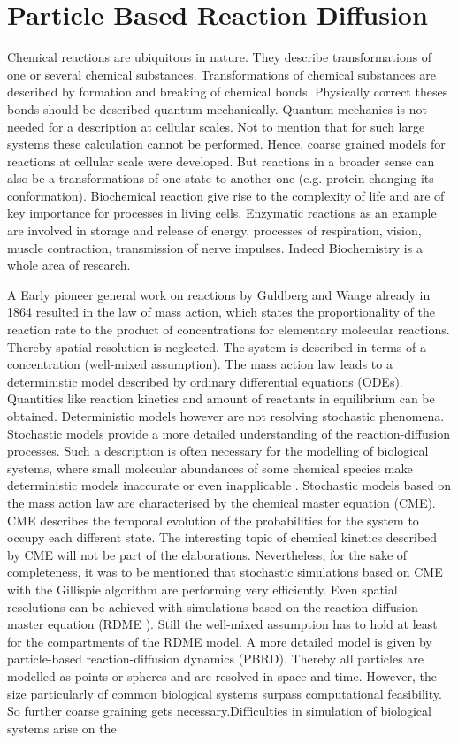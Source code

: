 \documentclass[
  a4paper,BCOR10mm,oneside,
  headsepline,footsepline,%
  fleqn,openbib
]{scrbook}
\begin{document}
\chapter{Particle Based Reaction Diffusion }
Chemical reactions are ubiquitous in nature. They describe transformations of one or several chemical substances. Transformations of chemical substances are described by formation and breaking of chemical bonds. Physically correct theses bonds should be described quantum mechanically. Quantum mechanics is not needed for a description at cellular scales. Not to mention that for such large systems these calculation cannot be performed. Hence, coarse grained models for reactions at cellular scale were developed. But reactions in a broader sense can also be a transformations of one state to another one (e.g. protein changing its conformation). Biochemical reaction give rise to the complexity of life and are of key importance for processes in living cells. Enzymatic reactions as an example are involved in storage and release of energy, processes of respiration, vision, muscle contraction, transmission of nerve impulses. Indeed Biochemistry is a whole area of research.\par A  Early pioneer general work on reactions by Guldberg and Waage already in 1864 \cite{Waage1986} resulted in the law of mass action, which states the proportionality of the reaction rate to the product of concentrations for elementary molecular reactions. Thereby spatial resolution is neglected. The system is described in terms of a concentration (well-mixed assumption). The mass action law leads to a deterministic model described by ordinary differential equations (ODEs). Quantities like reaction kinetics and amount of reactants in equilibrium can be obtained. Deterministic models however are not resolving stochastic phenomena. Stochastic models provide a more detailed understanding of the reaction-diffusion processes. Such a description is often necessary for the modelling of biological systems, where small molecular abundances of some chemical species make deterministic models inaccurate or even inapplicable \cite{0704.1908}. Stochastic models based on the mass action law are characterised by the chemical master equation (CME). CME describes the temporal evolution of the probabilities for the system to occupy each different state. The interesting topic of chemical kinetics described by CME will not be part of the elaborations. Nevertheless, for the sake of completeness, it was to be mentioned that stochastic simulations based on CME with the Gillispie algorithm \cite{Gillespie1977} are performing very efficiently. Even spatial resolutions can be achieved with simulations based on the reaction-diffusion master equation (RDME \cite{Winkelmann2016}). Still the well-mixed assumption has to hold at least for the compartments of the RDME model. A more detailed model is given by particle-based reaction-diffusion dynamics (PBRD)\cite{Schneberg2014,Gruenert2010}. Thereby all particles are modelled as points or spheres and are resolved in space and time. However, the size particularly of common biological systems surpass computational feasibility. So further coarse graining gets necessary.Difficulties in simulation of biological systems arise on the 
\end{document}

